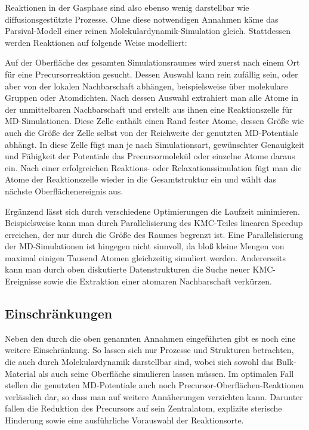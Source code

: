 Reaktionen in der Gasphase sind also ebenso wenig darstellbar wie diffusionsgestützte Prozesse.
Ohne diese notwendigen Annahmen käme das Parsival-Modell einer reinen Molekular\-dynamik-Simu\-lation gleich.
Stattdessen werden Reaktionen auf folgende Weise modelliert:

Auf der Oberfläche des gesamten Simulationsraumes wird zuerst nach einem Ort für eine Precursorreaktion gesucht.
Dessen Auswahl kann rein zufällig sein, oder aber von der lokalen Nachbarschaft abhängen, beispielsweise über molekulare Gruppen oder Atomdichten.
Nach dessen Auswahl extrahiert man alle Atome in der unmittelbaren Nachbarschaft und erstellt aus ihnen eine Reaktionszelle für MD-Simulationen.
Diese Zelle enthält einen Rand fester Atome, dessen Größe wie auch die Größe der Zelle selbst von der Reichweite der genutzten MD-Potentiale abhängt.
In diese Zelle fügt man je nach Simulationsart, gewünschter Genauigkeit und Fähigkeit der Potentiale das Precursormolekül oder einzelne Atome daraus ein.
Nach einer erfolgreichen Reaktions- oder Relaxationssimulation fügt man die Atome der Reaktionszelle wieder in die Gesamtstruktur ein und wählt das nächste Oberflächenereignis aus.

Ergänzend lässt sich durch verschiedene Optimierungen die Laufzeit minimieren.
Beispielsweise kann man durch Parallelisierung des KMC-Teiles linearen Speedup  erreichen, der nur durch die Größe des Raumes begrenzt ist.
Eine Parallelisierung der MD-Simulationen ist hingegen nicht sinnvoll, da bloß kleine Mengen von maximal einigen Tausend Atomen gleichzeitig simuliert werden.
Andererseits kann man durch oben diskutierte Datenstrukturen die Suche neuer KMC-Ereignisse sowie die Extraktion einer atomaren Nachbarschaft verkürzen.


\subsection{Einschränkungen}

Neben den durch die oben genannten Annahmen  eingeführten gibt es noch eine weitere Einschränkung.
So lassen sich nur Prozesse und Strukturen betrachten, die auch durch Molekulardynamik darstellbar sind, wobei sich sowohl das Bulk-Material als auch seine Oberfläche simulieren lassen müssen.
Im optimalen Fall stellen die genutzten MD-Potentiale auch noch Precursor-Oberflächen-Reaktionen verlässlich dar, so dass man auf weitere Annäherungen verzichten kann.
Darunter fallen die Reduktion des Precursors auf sein Zentralatom, explizite sterische Hinderung sowie eine ausführliche Vorauswahl der Reaktionsorte.

